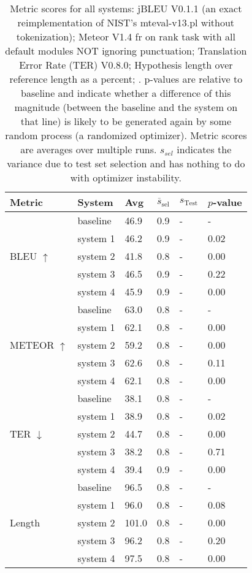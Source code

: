 \begin{table}[htb]
\begin{center}
\begin{footnotesize}
\begin{tabular}{|l|l|l|l|l|l|}
\hline
\bf Metric & \bf System & \bf Avg & \bf $\overline{s}_{\text{sel}}$ & \bf $s_{\text{Test}}$ & \bf $p$-value \\
\hline
\multirow{5}{*}{BLEU $\uparrow$}
& baseline & 46.9 & 0.9 & - & - \\
& system 1 & 46.2 & 0.9 & - & 0.02 \\
& system 2 & 41.8 & 0.8 & - & 0.00 \\
& system 3 & 46.5 & 0.9 & - & 0.22 \\
& system 4 & 45.9 & 0.9 & - & 0.00 \\
\hline
\multirow{5}{*}{METEOR $\uparrow$}
& baseline & 63.0 & 0.8 & - & - \\
& system 1 & 62.1 & 0.8 & - & 0.00 \\
& system 2 & 59.2 & 0.8 & - & 0.00 \\
& system 3 & 62.6 & 0.8 & - & 0.11 \\
& system 4 & 62.1 & 0.8 & - & 0.00 \\
\hline
\multirow{5}{*}{TER $\downarrow$}
& baseline & 38.1 & 0.8 & - & - \\
& system 1 & 38.9 & 0.8 & - & 0.02 \\
& system 2 & 44.7 & 0.8 & - & 0.00 \\
& system 3 & 38.2 & 0.8 & - & 0.71 \\
& system 4 & 39.4 & 0.9 & - & 0.00 \\
\hline
\multirow{5}{*}{Length }
& baseline & 96.5 & 0.8 & - & - \\
& system 1 & 96.0 & 0.8 & - & 0.08 \\
& system 2 & 101.0 & 0.8 & - & 0.00 \\
& system 3 & 96.2 & 0.8 & - & 0.20 \\
& system 4 & 97.5 & 0.8 & - & 0.00 \\
\hline
\end{tabular}
\end{footnotesize}
\end{center}
\caption{\label{tab:scores} Metric scores for all systems: jBLEU V0.1.1 (an exact reimplementation of NIST's mteval-v13.pl without tokenization); Meteor V1.4 fr on rank task with all default modules NOT ignoring punctuation; Translation Error Rate (TER) V0.8.0; Hypothesis length over reference length as a percent; . p-values are relative to baseline and indicate whether a difference of this magnitude (between the baseline and the system on that line) is likely to be generated again by some random process (a randomized optimizer). Metric scores are averages over multiple runs. $s_{sel}$ indicates the variance due to test set selection and has nothing to do with optimizer instability.}
\end{table}
